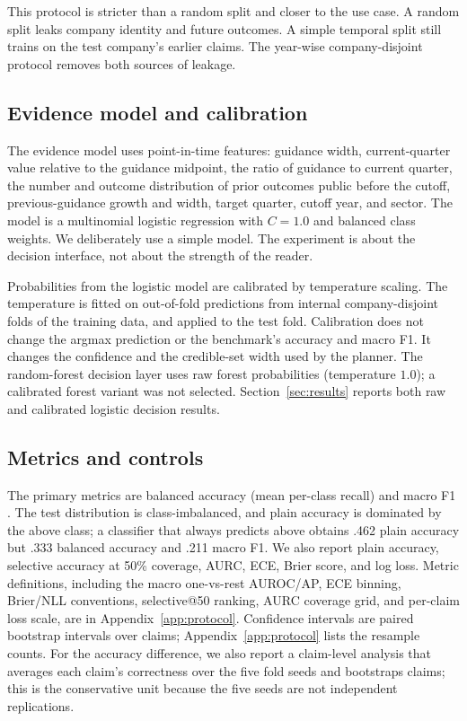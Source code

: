 \documentclass[11pt]{article}
\begin{document}
This protocol is stricter than a random split and closer to the use case. A random split leaks company identity and future outcomes. A simple temporal split still trains on the test company's earlier claims. The year-wise company-disjoint protocol removes both sources of leakage.

\subsection{Evidence model and calibration}
The evidence model uses point-in-time features: guidance width, current-quarter value relative to the guidance midpoint, the ratio of guidance to current quarter, the number and outcome distribution of prior outcomes public before the cutoff, previous-guidance growth and width, target quarter, cutoff year, and sector. The model is a multinomial logistic regression with $C=1.0$ and balanced class weights. We deliberately use a simple model. The experiment is about the decision interface, not about the strength of the reader.

Probabilities from the logistic model are calibrated by temperature scaling. The temperature is fitted on out-of-fold predictions from internal company-disjoint folds of the training data, and applied to the test fold. Calibration does not change the argmax prediction or the benchmark's accuracy and macro F1. It changes the confidence and the credible-set width used by the planner. The random-forest decision layer uses raw forest probabilities (temperature $1.0$); a calibrated forest variant was not selected. Section~\ref{sec:results} reports both raw and calibrated logistic decision results.

\subsection{Metrics and controls}
The primary metrics are balanced accuracy (mean per-class recall) \citep{brodersen2010balanced} and macro F1 \citep{sokolova2009performance}. The test distribution is class-imbalanced, and plain accuracy is dominated by the above class; a classifier that always predicts above obtains .462 plain accuracy but .333 balanced accuracy and .211 macro F1. We also report plain accuracy, selective accuracy at 50\% coverage, AURC, ECE, Brier score, and log loss. Metric definitions, including the macro one-vs-rest AUROC/AP, ECE binning, Brier/NLL conventions, selective@50 ranking, AURC coverage grid, and per-claim loss scale, are in Appendix~\ref{app:protocol}. Confidence intervals are paired bootstrap intervals over claims; Appendix~\ref{app:protocol} lists the resample counts. For the accuracy difference, we also report a claim-level analysis that averages each claim's correctness over the five fold seeds and bootstraps claims; this is the conservative unit because the five seeds are not independent replications.
\end{document}
